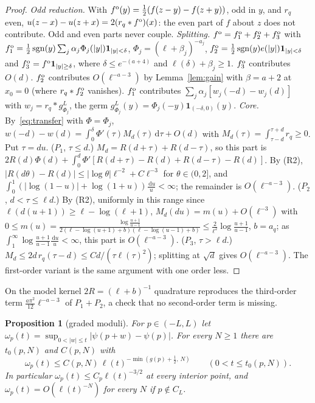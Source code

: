\documentclass[11pt]{amsart}
\newcommand{\one}{\mathbf{1}}
\newcommand{\dd}{\,\mathrm{d}}
\DeclareMathOperator{\sgn}{sgn}
\newtheorem{proposition}[theorem]{Proposition}
\theoremstyle{definition}
\theoremstyle{remark}
\numberwithin{equation}{section}
\begin{document}
\begin{proof}
\emph{Odd reduction.} With $f^{\rm o}(y)=\frac12(f(z-y)-f(z+y))$, odd in $y$, and $r_q$ even, $u(z-x)-u(z+x)=2(r_q*f^{\rm o})(x)$: the even part of $f$ about $z$ does not contribute. Odd and even parts never couple.
\emph{Splitting.} $f^{\rm o}=f^{\rm o}_1+f^{\rm o}_2+f^{\rm o}_3$ with $f^{\rm o}_1=\frac12\sgn(y)\sum_j\alpha_j\Phi_j(|y|)\one_{|y|<\delta}$, $\Phi_j=(\ell+\beta_j)^{-a_j}$, $f^{\rm o}_2=\frac12\sgn(y)e(|y|)\one_{|y|<\delta}$ and $f^{\rm o}_3=f^{\rm o}\one_{|y|\ge\delta}$, where $\delta\le e^{-(a+4)}$ and $\ell(\delta)+\beta_j\ge1$. $f^{\rm o}_3$ contributes $O(d)$. $f^{\rm o}_2$ contributes $O(\ell^{-a-3})$ by Lemma~\ref{lem:gain} with $\beta=a+2$ at $x_0=0$ (where $r_q*f^{\rm o}_2$ vanishes). $f^{\rm o}_1$ contributes $\sum_j\alpha_j[w_j(-d)-w_j(d)]$ with $w_j=r_q*g^L_{\Phi_j}$, the germ $g^L_{\Phi_j}(y)=\Phi_j(-y)\one_{(-\delta,0)}(y)$.
\emph{Core.} By~\eqref{eq:transfer} with $\Phi=\Phi_j$, $w(-d)-w(d)=\int_0^\delta\Phi'(\tau)M_d(\tau)\dd\tau+O(d)$ with $M_d(\tau)=\int_{\tau-d}^{\tau+d}r_q\ge0$. Put $\tau=du$.
($P_1$, $\tau\le d$.) $M_d=R(d+\tau)+R(d-\tau)$, so this part is $2R(d)\Phi(d)+\int_0^d\Phi'[R(d+\tau)-R(d)+R(d-\tau)-R(d)]$. By (R2), $|R(d\theta)-R(d)|\le|\log\theta|\ell^{-2}+C\ell^{-3}$ for $\theta\in(0,2]$, and $\int_0^1(|\log(1-u)|+\log(1+u))\frac{\dd u}u<\infty$; the remainder is $O(\ell^{-a-3})$.
($P_2$, $d<\tau\le\ell d$.) By (R2), uniformly in this range since $\ell(d(u+1))\ge\ell-\log(\ell+1)$, $M_d(du)=m(u)+O(\ell^{-3})$ with $0\le m(u)=\frac{\log\frac{u+1}{u-1}}{2(\ell-\log(u+1)+b)(\ell-\log(u-1)+b)}\le\frac2{\ell^2}\log\frac{u+1}{u-1}$, $b=a_q$; as $\int_1^\infty\log\frac{u+1}{u-1}\frac{\dd u}u<\infty$, this part is $O(\ell^{-a-3})$.
($P_3$, $\tau>\ell d$.) $M_d\le2d\,r_q(\tau-d)\le Cd/(\tau\ell(\tau)^2)$; splitting at $\sqrt d$ gives $O(\ell^{-a-3})$.
The first-order variant is the same argument with one order less.
\end{proof}

On the model kernel $2R=(\ell+b)^{-1}$ quadrature reproduces the third-order term $\frac{a\pi^2}{12}\ell^{-a-3}$ of $P_1+P_2$, a check that no second-order term is missing.

\begin{proposition}[graded moduli]\label{prop:graded}
For $p\in(-L,L)$ let $\omega_p(t)=\sup_{0<|w|\le t}|\psi(p+w)-\psi(p)|$. For every $N\ge1$ there are $t_0(p,N)$ and $C(p,N)$ with
\[
\omega_p(t)\le C(p,N)\,\ell(t)^{-\min(g(p)+\frac12,\,N)}\qquad(0<t\le t_0(p,N)).
\]
In particular $\omega_p(t)\le C_p\ell(t)^{-3/2}$ at every interior point, and $\omega_p(t)=O(\ell(t)^{-N})$ for every $N$ if $p\notin C_L$.
\end{proposition}
\end{document}

